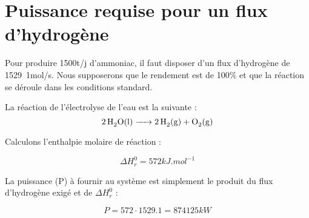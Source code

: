 \documentclass[10pt,a4paper]{article}
\begin{document}
\section{Puissance requise pour un flux d'hydrogène}

Pour produire \unit{1500}{t/j} d'ammoniac, il faut disposer d'un flux d'hydrogène de \unit{1529.1}{mol/s}. Nous supposerons que le rendement est de \unit{100}{\%} et que la réaction se déroule dans les conditions standard. 

La réaction de l’électrolyse de l'eau est la suivante : 
$$\ce {2H2O(l) -> 2H2(g) + O2(g)}$$ 

Calculons l'enthalpie molaire de réaction :

$$ \Delta H_r^0 =  \unit{572}{kJ.mol^{-1}} $$

La puissance (P) à fournir au système est simplement le produit du flux d'hydrogène exigé et de $ \Delta H_r^0$ :

$$ P = 572\cdot1529.1 = \unit{874 125}{kW} $$
\end{document}
